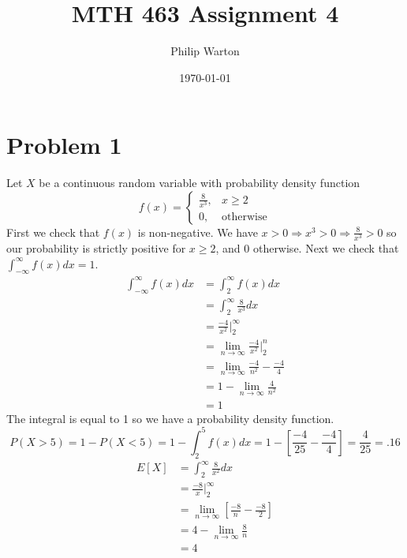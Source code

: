 \documentclass{article}
\begin{document}
\title{MTH 463 Assignment 4}
\author{Philip Warton}
\date{\today}
\maketitle
\section*{Problem 1}
    Let $X$ be a continuous random variable with probability density function
    \[
        f(x) = 
        \begin{cases}
            \frac{8}{x^3}, & x \geq 2\\
            0, & \text{otherwise}
        \end{cases}
    \]
    First we check that $f(x)$ is non-negative. We have $x > 0 \Rightarrow x^3 > 0 \Rightarrow \frac{8}{x^3} > 0$ so 
    our probability is strictly positive for $x \geq 2$, and 0 otherwise. Next
    we check that $\int_{-\infty}^\infty f(x) dx = 1$.
    \begin{align*}
        \int_{-\infty}^\infty f(x) dx & = \int_2^\infty f(x) dx\\
        &= \int_2^\infty \frac{8}{x^3} dx\\
        &= \frac{-4}{x^2}\bigg|_2^\infty\\
        &= \lim_{n \rightarrow \infty} \frac{-4}{x^2}\bigg|_2^n\\
        & = \lim_{n \rightarrow \infty} \frac{-4}{n^2} - \frac{-4}{4}\\
        & = 1 - \lim_{n \rightarrow \infty} \frac{4}{n^2}\\
        & = 1
    \end{align*}
    The integral is equal to 1 so we have a probability density function.
    \[
        P(X > 5) = 1 - P(X < 5) = 1 - \int_2^5 f(x)dx = 1 - \left[\frac{-4}{25} - \frac{-4}{4}\right] = \frac{4}{25} = .16
    \]
    \begin{align*}
        E[X] &= \int_2^\infty \frac{8}{x^2} dx\\
        &= \frac{-8}{x}\bigg|_2^\infty \\
        &= \lim_{n \rightarrow \infty} \left[\frac{-8}{n} - \frac{-8}{2}\right]\\
        &= 4 - \lim_{n \rightarrow \infty} \frac{8}{n}\\
        &= 4
    \end{align*}
\end{document}
